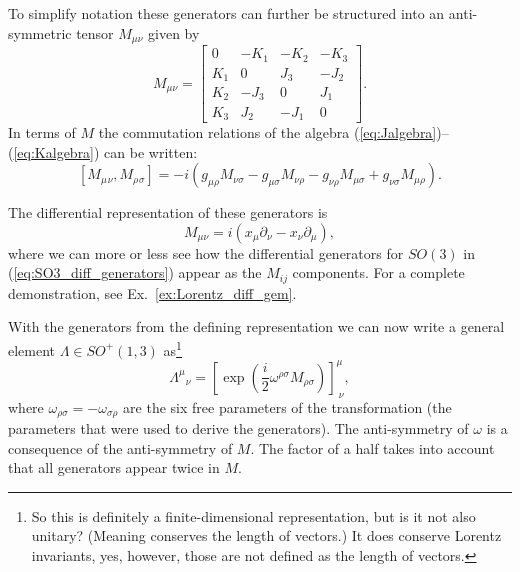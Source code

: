 \documentclass[notes.tex]{subfiles}
\begin{document}
To simplify notation these generators can further be structured into an anti-symmetric tensor $M_{\mu\nu}$ given by
\begin{equation}
M_{\mu\nu} = \begin{bmatrix}0 & -K_1 & -K_2 & -K_3\\ K_1 & 0 & J_3 & -J_2\\ K_2 & -J_3 & 0 & J_1 \\ K_3 & J_2 & - J_1 & 0\end{bmatrix}.
\label{eq:M}
\end{equation}
In terms of $M$ the commutation relations of the algebra (\ref{eq:Jalgebra})--(\ref{eq:Kalgebra})  can be written:
\begin{equation}\label{eq:poco1}
[M_\mu{}_\nu, M_\rho{}_\sigma] = -i(g_{\mu\rho}M_{\nu\sigma} - g_{\mu\sigma}M_{\nu\rho} - g_{\nu\rho}M_{\mu\sigma} + g_{\nu\sigma}M_{\mu\rho}).
\end{equation}

The differential representation of these generators is
\begin{equation}
M_{\mu\nu}=i(x_\mu\partial_\nu-x_\nu\partial_\mu),
\label{eq:Lorentz_diff_gen}
\end{equation}
where we can more or less  see how the differential generators for $SO(3)$ in (\ref{eq:SO3_diff_generators}) appear as the $M_{ij}$ components. For a complete demonstration, see Ex.~\ref{ex:Lorentz_diff_gem}.

With the generators from the defining representation we can now write a general element $\Lambda \in SO^+(1,3)$ as\footnote{So this is definitely a finite-dimensional representation, but is it not also unitary? (Meaning conserves the length of vectors.) It does conserve Lorentz invariants, yes, however, those are not defined as the length of vectors.}
\begin{equation}
\Lambda^\mu{}_\nu = \left[\exp\left(\frac{i}{2}\omega^{\rho \sigma}M_{\rho \sigma}\right)\right]^\mu_{~\nu},
\label{eq:exp_map_Lorentz}
\end{equation}
where $\omega_{\rho\sigma} = -\omega_{\sigma \rho}$ are the six free parameters of the transformation (the parameters that were used to derive the generators). The anti-symmetry of $\omega$ is a consequence of the anti-symmetry of $M$. The factor of a half takes into account that all generators appear twice in $M$. 
\end{document}
